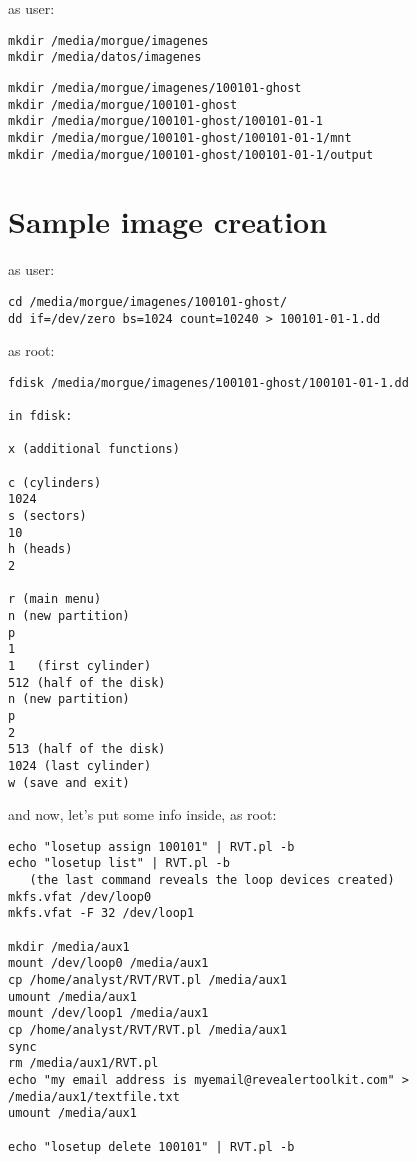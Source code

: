 \documentclass[a4paper,11pt,oneside]{report}
\begin{document}
as user:

\begin{verbatim}
mkdir /media/morgue/imagenes
mkdir /media/datos/imagenes
\end{verbatim}

\begin{verbatim}
mkdir /media/morgue/imagenes/100101-ghost
mkdir /media/morgue/100101-ghost
mkdir /media/morgue/100101-ghost/100101-01-1
mkdir /media/morgue/100101-ghost/100101-01-1/mnt
mkdir /media/morgue/100101-ghost/100101-01-1/output
\end{verbatim}



\section{Sample image creation}

as user:

\begin{verbatim}
cd /media/morgue/imagenes/100101-ghost/
dd if=/dev/zero bs=1024 count=10240 > 100101-01-1.dd
\end{verbatim}

as root:

\begin{verbatim}
fdisk /media/morgue/imagenes/100101-ghost/100101-01-1.dd

in fdisk:

x (additional functions)

c (cylinders)
1024
s (sectors)
10
h (heads)
2

r (main menu)
n (new partition)
p 
1
1   (first cylinder)
512 (half of the disk)
n (new partition)
p 
2
513 (half of the disk)
1024 (last cylinder)
w (save and exit)
\end{verbatim}

and now, let's put some info inside, as root:

\begin{verbatim}
echo "losetup assign 100101" | RVT.pl -b
echo "losetup list" | RVT.pl -b  
   (the last command reveals the loop devices created)
mkfs.vfat /dev/loop0
mkfs.vfat -F 32 /dev/loop1   

mkdir /media/aux1
mount /dev/loop0 /media/aux1
cp /home/analyst/RVT/RVT.pl /media/aux1
umount /media/aux1
mount /dev/loop1 /media/aux1
cp /home/analyst/RVT/RVT.pl /media/aux1
sync
rm /media/aux1/RVT.pl
echo "my email address is myemail@revealertoolkit.com" > /media/aux1/textfile.txt
umount /media/aux1

echo "losetup delete 100101" | RVT.pl -b
\end{verbatim}
\end{document}
